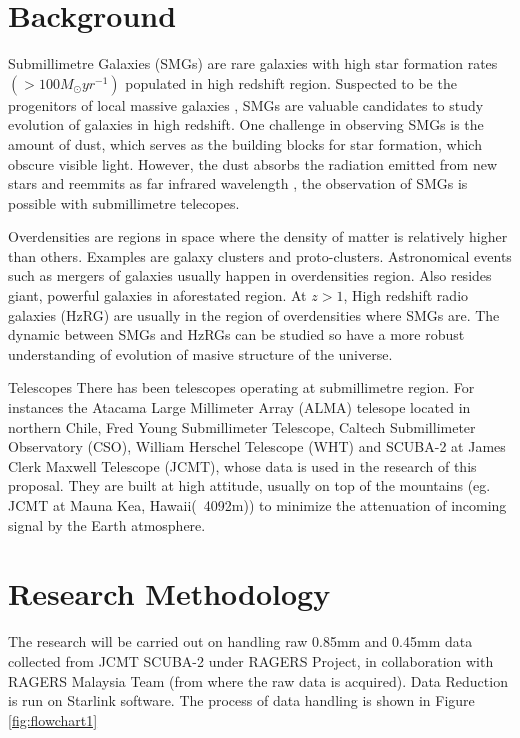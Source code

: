 \documentclass{article}
\begin{document}
\section{Background}
\medskip

\noindent Submillimetre Galaxies (SMGs) are rare galaxies with high star formation rates $(>100M_\odot yr^{-1})$ \cite{DaCunha2021} populated in high redshift region. Suspected to be the progenitors of local massive galaxies \cite{Casey2014}, SMGs are valuable candidates to study evolution of galaxies in high redshift. One challenge in observing SMGs is the amount of dust, which serves as the building blocks for star formation, which obscure visible light. However, the dust absorbs the radiation emitted from new stars and reemmits as far infrared wavelength \cite{Casey2014}, the observation of SMGs is possible with submillimetre telecopes. 
\medskip

\noindent Overdensities are regions in space where the density of matter is relatively higher than others. Examples are galaxy clusters and proto-clusters. Astronomical events such as mergers of galaxies usually happen in overdensities region. Also resides giant, powerful galaxies in aforestated region. At $z>1$, High redshift radio galaxies (HzRG) are usually in the region of overdensities where SMGs are. The dynamic between SMGs and HzRGs can be studied so have a more robust understanding of evolution of masive structure of the universe.\cite{Saxena2018}
\medskip

\noindent Telescopes There has been telescopes operating at submillimetre region. For instances the Atacama Large Millimeter Array (ALMA) telesope located in northern Chile, Fred Young Submillimeter Telescope, Caltech Submillimeter Observatory (CSO), William Herschel Telescope (WHT)\cite{Phillips2013} and SCUBA-2 at James Clerk Maxwell Telescope (JCMT), whose data is used in the research of this proposal. They are built at high attitude, usually on top of the mountains (eg. JCMT at Mauna Kea, Hawaii(~4092m)) to minimize the attenuation of incoming signal by the Earth atmosphere.\cite{Phillips2013}

\section{Research Methodology}

The research will be carried out on handling raw 0.85mm and 0.45mm data collected from JCMT SCUBA-2 under RAGERS Project, in collaboration with RAGERS Malaysia Team (from where the raw data is acquired). Data Reduction is run on Starlink software. The process of data handling is shown in Figure \ref{fig:flowchart1}
\end{document}
